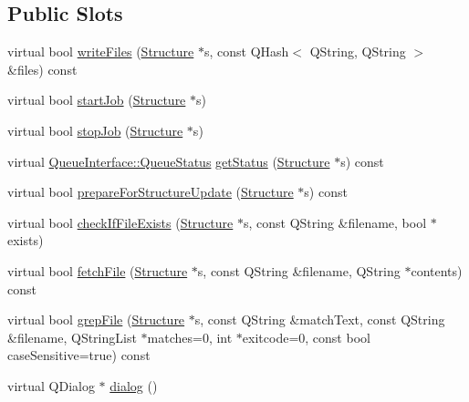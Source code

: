 \subsection*{Public Slots}
\begin{DoxyCompactItemize}
\item 
virtual bool \hyperlink{classGlobalSearch_1_1LocalQueueInterface_a68b017d4ee519055fc22dcb486ec2d45}{write\+Files} (\hyperlink{classGlobalSearch_1_1Structure}{Structure} $\ast$s, const Q\+Hash$<$ Q\+String, Q\+String $>$ \&files) const 
\item 
virtual bool \hyperlink{classGlobalSearch_1_1LocalQueueInterface_a5dae655b3316d9443ca5865a65b8d9f4}{start\+Job} (\hyperlink{classGlobalSearch_1_1Structure}{Structure} $\ast$s)
\item 
virtual bool \hyperlink{classGlobalSearch_1_1LocalQueueInterface_abd9adf1468347b0bdcc4f1f8c3676c1a}{stop\+Job} (\hyperlink{classGlobalSearch_1_1Structure}{Structure} $\ast$s)
\item 
virtual \hyperlink{classGlobalSearch_1_1QueueInterface_a08dcf06d1b99f6333472470490ca9a6d}{Queue\+Interface\+::\+Queue\+Status} \hyperlink{classGlobalSearch_1_1LocalQueueInterface_a1a6177bcf15d3df5dd744ca096cab86d}{get\+Status} (\hyperlink{classGlobalSearch_1_1Structure}{Structure} $\ast$s) const 
\item 
virtual bool \hyperlink{classGlobalSearch_1_1LocalQueueInterface_aec8ffad280b7e550d90529624c3b50fe}{prepare\+For\+Structure\+Update} (\hyperlink{classGlobalSearch_1_1Structure}{Structure} $\ast$s) const 
\item 
virtual bool \hyperlink{classGlobalSearch_1_1LocalQueueInterface_a7dfd8f70a313746a2651b405651d5c6c}{check\+If\+File\+Exists} (\hyperlink{classGlobalSearch_1_1Structure}{Structure} $\ast$s, const Q\+String \&filename, bool $\ast$exists)
\item 
virtual bool \hyperlink{classGlobalSearch_1_1LocalQueueInterface_ae0b1b95c62405c79b41604b7a4794a0d}{fetch\+File} (\hyperlink{classGlobalSearch_1_1Structure}{Structure} $\ast$s, const Q\+String \&filename, Q\+String $\ast$contents) const 
\item 
virtual bool \hyperlink{classGlobalSearch_1_1LocalQueueInterface_a948f5d6109f3fd3dff74799bb7573363}{grep\+File} (\hyperlink{classGlobalSearch_1_1Structure}{Structure} $\ast$s, const Q\+String \&match\+Text, const Q\+String \&filename, Q\+String\+List $\ast$matches=0, int $\ast$exitcode=0, const bool case\+Sensitive=true) const 
\item 
virtual Q\+Dialog $\ast$ \hyperlink{group__dialog_ga4bd87bf2050209a72d1a35c824e515da}{dialog} ()
\end{DoxyCompactItemize}
